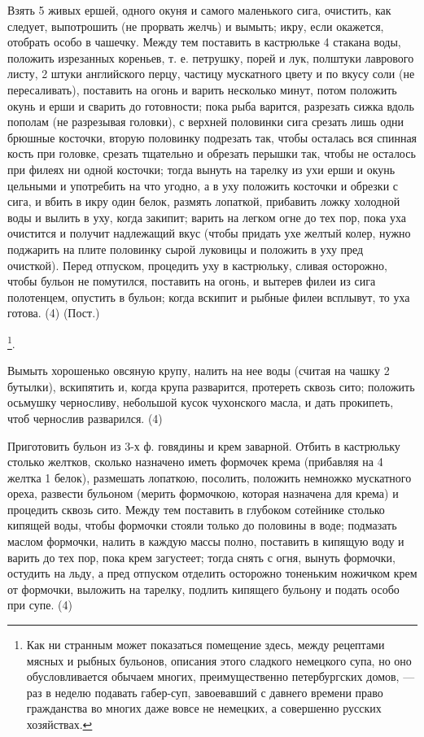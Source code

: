 Взять 5 живых ершей, одного окуня и самого маленького сига, очистить, как следует, выпотрошить (не прорвать желчь) и вымыть; икру, если окажется, отобрать особо в чашечку. Между тем поставить в кастрюльке 4 стакана воды, положить изрезанных кореньев, т. е. петрушку, порей и лук, полштуки лаврового листу, 2 штуки английского перцу, частицу мускатного цвету и по вкусу соли (не пересаливать), поставить на огонь и варить несколько минут, потом положить окунь и ерши и сварить до готовности; пока рыба варится, разрезать сижка вдоль пополам (не разрезывая головки), с верхней половинки сига срезать лишь одни брюшные косточки, вторую половинку подрезать так, чтобы осталась вся спинная кость при головке, срезать тщательно и обрезать перышки так, чтобы не осталось при филеях ни одной косточки; тогда вынуть на тарелку из ухи ерши и окунь цельными и употребить на что угодно, а в уху положить косточки и обрезки с сига, и вбить в икру один белок, размять лопаткой, прибавить ложку холодной воды и вылить в уху, когда закипит; варить на легком огне до тех пор, пока уха очистится и получит надлежащий вкус (чтобы придать ухе желтый колер, нужно поджарить на плите половинку сырой луковицы и положить в уху пред очисткой). Перед отпуском, процедить уху в кастрюльку, сливая осторожно, чтобы бульон не помутился, поставить на огонь, и вытерев филеи из сига полотенцем, опустить в бульон; когда вскипит и рыбные филеи всплывут, то уха готова. (4) (Пост.)

\footnote{Как ни странным может показаться помещение здесь, между рецептами мясных и рыбных бульонов, описания этого сладкого немецкого супа, но оно обусловливается обычаем многих, преимущественно петербургских домов, — раз в неделю подавать габер-суп, завоевавший с давнего времени право гражданства во многих даже вовсе не немецких, а совершенно русских хозяйствах.}.

Вымыть хорошенько овсяную крупу, налить на нее воды (считая на чашку 2 бутылки), вскипятить и, когда крупа разварится, протереть сквозь сито; положить осьмушку черносливу, небольшой кусок чухонского масла, и дать прокипеть, чтоб чернослив разварился. (4)


Приготовить бульон из 3-х ф. говядины и крем заварной. Отбить в кастрюльку столько желтков, сколько назначено иметь формочек крема (прибавляя на 4 желтка 1 белок), размешать лопаткою, посолить, положить немножко мускатного ореха, развести бульоном (мерить формочкою, которая назначена для крема) и процедить сквозь сито. Между тем поставить в глубоком сотейнике столько кипящей воды, чтобы формочки стояли только до половины в воде; подмазать маслом формочки, налить в каждую массы полно, поставить в кипящую воду и варить до тех пор, пока крем загустеет; тогда снять с огня, вынуть формочки, остудить на льду, а пред отпуском отделить осторожно тоненьким ножичком крем от формочки, выложить на тарелку, подлить кипящего бульону и подать особо при супе. (4)


